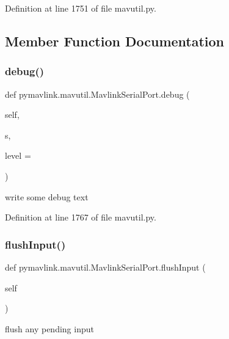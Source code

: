 Definition at line 1751 of file mavutil.\+py.



\subsection{Member Function Documentation}
\mbox{\label{classpymavlink_1_1mavutil_1_1MavlinkSerialPort_a1eb7dbf7a42f76566838ef6552789fcc}} 
\subsubsection{\texorpdfstring{debug()}{debug()}}
{\footnotesize\ttfamily def pymavlink.\+mavutil.\+Mavlink\+Serial\+Port.\+debug (\begin{DoxyParamCaption}\item[{}]{self,  }\item[{}]{s,  }\item[{}]{level = {} }\end{DoxyParamCaption})}

\begin{DoxyVerb}write some debug text\end{DoxyVerb}
 

Definition at line 1767 of file mavutil.\+py.

\mbox{\label{classpymavlink_1_1mavutil_1_1MavlinkSerialPort_a88334caabef6a1866bef8601a6b84cf9}} 
\subsubsection{\texorpdfstring{flushInput()}{flushInput()}}
{\footnotesize\ttfamily def pymavlink.\+mavutil.\+Mavlink\+Serial\+Port.\+flush\+Input (\begin{DoxyParamCaption}\item[{}]{self }\end{DoxyParamCaption})}

\begin{DoxyVerb}flush any pending input\end{DoxyVerb}
 


